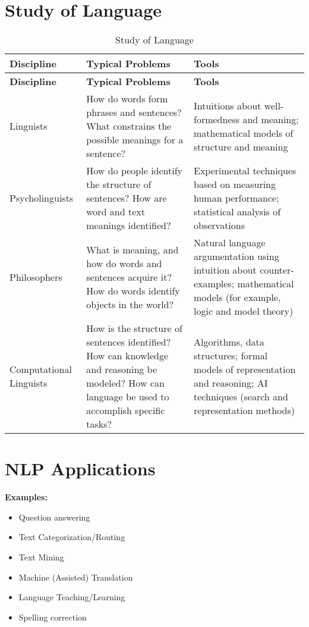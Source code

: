 \section{Study of Language}
\begin{longtable}{|p{4cm}|p{6cm}|p{6cm}|}
\caption{Study of Language}\\
\hline
\textbf{Discipline} & \textbf{Typical Problems} & \textbf{Tools} \\
\hline
\endfirsthead

\hline
\textbf{Discipline} & \textbf{Typical Problems} & \textbf{Tools} \\
\hline
\endhead

\hline
\endfoot

\hline
\endlastfoot

Linguists & How do words form phrases and sentences? What constrains the possible meanings for a sentence? & Intuitions about well-formedness and meaning; mathematical models of structure and meaning \\
\hline
Psycholinguists & How do people identify the structure of sentences? How are word and text meanings identified? & Experimental techniques based on measuring human performance; statistical analysis of observations \\
\hline
Philosophers & What is meaning, and how do words and sentences acquire it? How do words identify objects in the world? & Natural language argumentation using intuition about counter-examples; mathematical models (for example, logic and model theory) \\
\hline
Computational Linguists & How is the structure of sentences identified? How can knowledge and reasoning be modeled? How can language be used to accomplish specific tasks? & Algorithms, data structures; formal models of representation and reasoning; AI techniques (search and representation methods) \\
\hline

\end{longtable}

\section{NLP Applications}

\textbf{Examples:}
\begin{itemize}
    \item Question answering
    \item Text Categorization/Routing
    \item Text Mining
    \item Machine (Assisted) Translation
    \item Language Teaching/Learning
    \item Spelling correction
\end{itemize}

